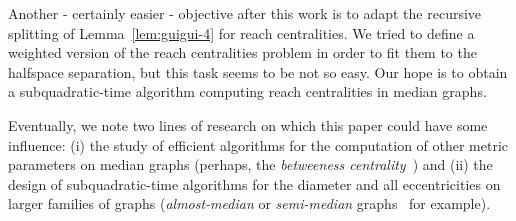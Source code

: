 \documentclass{article}
\begin{document}
Another - certainly easier - objective after this work is to adapt the recursive splitting of Lemma~\ref{lem:guigui-4} for reach centralities. We tried to define a weighted version of the reach centralities problem in order to fit them to the halfspace separation, but this task seems to be not so easy. Our hope is to obtain a subquadratic-time algorithm computing reach centralities in median graphs. 

Eventually, we note two lines of research on which this paper could have some influence: (i) the study of efficient algorithms for the computation of other metric parameters on median graphs (perhaps, the \textit{betweeness centrality}~\cite{AbGrWi15}) and (ii) the design of subquadratic-time algorithms for the diameter and all eccentricities on larger families of graphs (\textit{almost-median} or \textit{semi-median} graphs~\cite{Br07,KlSh12} for example).




\end{document}
